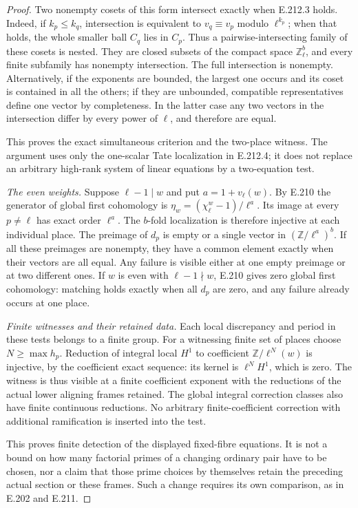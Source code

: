 \begin{proof}
Two nonempty cosets of this form intersect exactly when
E.212.3 holds. Indeed, if $k_p\le k_q$, intersection is
equivalent to $v_q\equiv v_p$ modulo $\ell^{k_p}$; when
that holds, the whole smaller ball $C_q$ lies in $C_p$.
Thus a pairwise-intersecting family of these cosets is
nested. They are closed subsets of the compact space
$\mathbb Z_\ell^b$, and every finite subfamily has nonempty
intersection. The full intersection is nonempty.
Alternatively, if the exponents are bounded, the largest
one occurs and its coset is contained in all the others;
if they are unbounded, compatible representatives define
one vector by completeness. In the latter case any two
vectors in the intersection differ by every power of
$\ell$, and therefore are equal.

This proves the exact simultaneous criterion and the
two-place witness. The argument uses only the one-scalar
Tate localization in E.212.4; it does not replace an
arbitrary high-rank system of linear equations by a
two-equation test.

\emph{The even weights.}
Suppose $\ell-1\mid w$ and put $a=1+v_\ell(w)$.
By E.210 the generator of global first cohomology is
$\eta_w=(\chi_\ell^w-1)/\ell^a$. Its image at every
$p\ne\ell$ has exact order $\ell^a$.
The $b$-fold localization is therefore injective at each
individual place. The preimage of $d_p$ is empty or a
single vector in $(\mathbb Z/\ell^a)^b$.
If all these preimages are nonempty, they have a common
element exactly when their vectors are all equal. Any
failure is visible either at one empty preimage or at two
different ones. If $w$ is even with $\ell-1\nmid w$,
E.210 gives zero global first cohomology: matching holds
exactly when all $d_p$ are zero, and any failure already
occurs at one place.

\emph{Finite witnesses and their retained data.}
Each local discrepancy and period in these tests belongs
to a finite group. For a witnessing finite set of places
choose $N\ge\max h_p$. Reduction of integral local
$H^1$ to coefficient $\mathbb Z/\ell^N(w)$ is injective,
by the coefficient exact sequence: its kernel is
$\ell^N H^1$, which is zero. The witness is thus visible
at a finite coefficient exponent with the reductions of
the actual lower aligning frames retained. The global
integral correction classes also have finite continuous
reductions. No arbitrary finite-coefficient correction
with additional ramification is inserted into the test.

This proves finite detection of the displayed fixed-fibre
equations. It is not a bound on how many factorial primes
of a changing ordinary pair have to be chosen, nor a
claim that those prime choices by themselves retain the
preceding actual section or these frames. Such a change
requires its own comparison, as in E.202 and E.211.


\end{proof}
